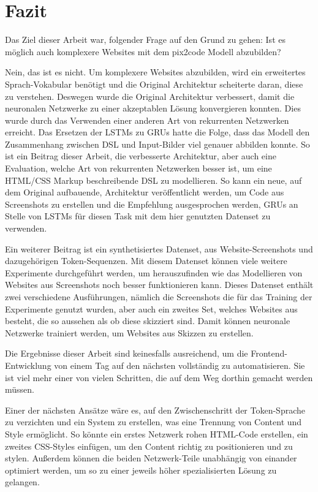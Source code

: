 \documentclass[pdftex,a4paper,halfparskip, article]{scrartcl}
\begin{document}
\newpage
\section{Fazit}

Das Ziel dieser Arbeit war, folgender Frage auf den Grund zu gehen: Ist es möglich auch komplexere Websites mit dem pix2code Modell abzubilden?  

Nein, das ist es nicht. Um komplexere Websites abzubilden, wird ein erweitertes Sprach-Vokabular benötigt und die Original Architektur scheiterte daran, diese zu verstehen.
Deswegen wurde die Original Architektur verbessert, damit die neuronalen Netzwerke zu einer akzeptablen Lösung konvergieren konnten. Dies wurde durch das Verwenden einer anderen Art von rekurrenten Netzwerken erreicht. Das Ersetzen der LSTMs zu GRUs hatte die Folge, dass das Modell den Zusammenhang zwischen DSL und Input-Bilder viel genauer abbilden konnte. So ist ein Beitrag dieser Arbeit, die verbesserte Architektur, aber auch eine Evaluation, welche Art von rekurrenten Netzwerken besser ist, um eine HTML/CSS Markup beschreibende DSL zu modellieren. So kann ein neue, auf dem Original aufbauende, Architektur veröffentlicht werden, um Code aus Screenshots zu erstellen und die Empfehlung ausgesprochen werden, GRUs an Stelle von LSTMs für diesen Task mit dem hier genutzten Datenset zu verwenden.

Ein weiterer Beitrag ist ein synthetisiertes Datenset, aus Website-Screenshots und dazugehörigen Token-Sequenzen. Mit diesem Datenset können viele weitere Experimente durchgeführt werden, um herauszufinden wie das Modellieren von Websites aus Screenshots noch besser funktionieren kann. Dieses Datenset enthält zwei verschiedene Ausführungen, nämlich die Screenshots die für das Training der Experimente genutzt wurden, aber auch ein zweites Set, welches Websites aus besteht, die so aussehen als ob diese skizziert sind. Damit können neuronale Netzwerke trainiert werden, um Websites aus Skizzen zu erstellen.

Die Ergebnisse dieser Arbeit sind keinesfalls ausreichend, um die Frontend-Entwicklung von einem Tag auf den nächsten vollständig zu automatisieren. Sie ist viel mehr einer von vielen Schritten, die auf dem Weg dorthin gemacht werden müssen. 

Einer der nächsten Ansätze wäre es, auf den Zwischenschritt der Token-Sprache zu verzichten und ein System zu erstellen, was eine Trennung von Content und Style ermöglicht. So könnte ein erstes Netzwerk rohen HTML-Code erstellen, ein zweites CSS-Styles einfügen, um den Content richtig zu positionieren und zu stylen. Außerdem können die beiden Netzwerk-Teile unabhängig von einander optimiert werden, um so zu einer jeweils höher spezialisierten Lösung zu gelangen.
\end{document}
